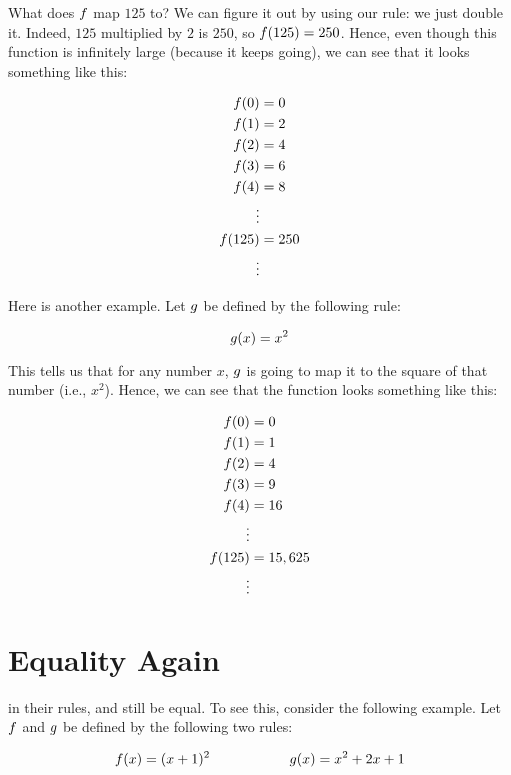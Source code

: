 \documentclass[../../../main.tex]{subfiles}
\begin{document}
What does $f$ map $125$ to? We can figure it out by using our rule: we just double it. Indeed, $125$ multiplied by $2$ is $250$, so $f(125) = 250$. Hence, even though this function is infinitely large (because it keeps going), we can see that it looks something like this:

\begin{align*}
  f(0) &= 0 \\
  f(1) &= 2 \\
  f(2) &= 4 \\
  f(3) &= 6 \\
  f(4) &= 8 \\
  \vdots & ~ \\
  f(125) &= 250 \\
  \vdots & ~
\end{align*}

Here is another example. Let $g$ be defined by the following rule:

\begin{equation*}
  g(x) = x^{2}
\end{equation*}

This tells us that for any number $x$, $g$ is going to map it to the square of that number (i.e., $x^{2}$). Hence, we can see that the function looks something like this:

\begin{align*}
  f(0) &= 0 \\
  f(1) &= 1 \\
  f(2) &= 4 \\
  f(3) &= 9 \\
  f(4) &= 16 \\
  \vdots & ~ \\
  f(125) &= 15,625 \\
  \vdots & ~
\end{align*}


\section{Equality Again}

 in their rules, and still be equal. To see this, consider the following example. Let $f$ and $g$ be defined by the following two rules:

\begin{equation*}
  f(x) = (x + 1)^{2} \hskip 2cm g(x) = x^{2} + 2x + 1
\end{equation*}
\end{document}
